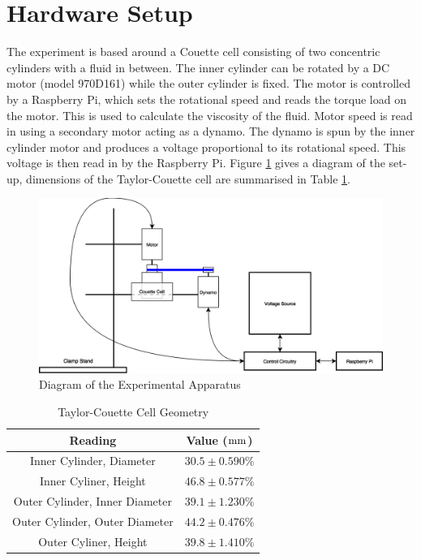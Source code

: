 \documentclass[twoside,a4]{report}
\begin{document}
	\section{Hardware Setup}
	The experiment is based around a Couette cell consisting of two concentric cylinders with a fluid in between. The inner cylinder can be rotated by a DC motor (model 970D161) while the outer cylinder is fixed. The motor is controlled by a Raspberry Pi, which sets the rotational speed and reads the torque load on the motor. This is used to calculate the viscosity of the fluid. Motor speed is read in using a secondary motor acting as a dynamo. The dynamo is spun by the inner cylinder motor and produces a voltage proportional to its rotational speed. This voltage is then read in by the Raspberry Pi.
	Figure \ref{expdia} gives a diagram of the set-up, dimensions of the Taylor-Couette cell are summarised in Table \ref{tabcellgeom}.
	\newline
	\begin{figure}[!htb]
		\centering
		\includegraphics[scale=0.3]{images/exp_set_up.png} %
		\caption{Diagram of the Experimental Apparatus}
		\label{expdia}
	\end{figure}
	\begin{table}
		\centering
		\caption{Taylor-Couette Cell Geometry}
		\label{tabcellgeom}
		\begin{tabular}{|c|c|}
			\hline
			Reading 						& Value ($\rm mm$) \\
			\hline
			Inner Cylinder, Diameter 		& $30.5 \pm 0.590 \%$\\
			Inner Cyliner, Height 			& $46.8 \pm 0.577 \%$\\
			Outer Cylinder, Inner Diameter 	& $39.1 \pm 1.230 \%$\\
			Outer Cylinder, Outer Diameter 	& $44.2 \pm 0.476 \%$\\
			Outer Cyliner, Height 			& $39.8 \pm 1.410 \%$\\
			\hline
		\end{tabular}
	\end{table}
\end{document}
